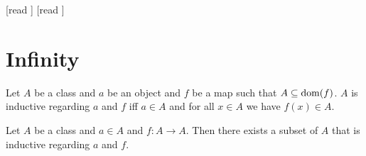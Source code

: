 \documentclass[10pt]{article}
\begin{document}
  \begin{imports}
    \begin{forthel}
      [read ]
      [read ]
    \end{forthel}
  \end{imports}


  \section{Infinity}

  \begin{forthel}
    \begin{definition}[id=FOUNDATIONS_10_298374925738210,printid]
      Let $A$ be a class and $a$ be an object and $f$ be a map such that $A \subseteq \operatorname{dom}(f)$.
      $A$ is inductive regarding $a$ and $f$ iff $a \in A$ and for all $x \in A$ we have $f(x) \in A$.
    \end{definition}
  \end{forthel}

  \begin{forthel}
    \begin{axiom}[title=Infinity Axiom,id=FOUNDATIONS_10_367388832825344,printid]
      Let $A$ be a class and $a \in A$ and $f : A \to A$.
      Then there exists a subset of $A$ that is inductive regarding $a$ and $f$.
    \end{axiom}
  \end{forthel}
\end{document}
